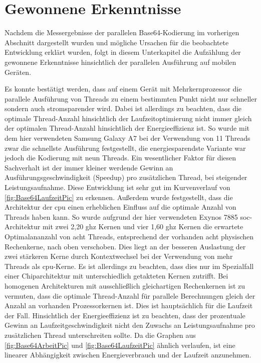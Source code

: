 \section{Gewonnene Erkenntnisse}

Nachdem die Messergebnisse der parallelen Base64-Kodierung im vorherigen Abschnitt dargestellt wurden und mögliche Ursachen für die beobachtete Entwicklung erklärt wurden, folgt in diesem Unterkapitel die Aufzählung der gewonnene Erkenntnisse hinsichtlich der parallelen Ausführung auf mobilen Geräten.

Es konnte bestätigt werden, dass auf einem Gerät mit Mehrkernprozessor die parallele Ausführung von Threads zu einem bestimmten Punkt nicht nur schneller sondern auch stromsparender wird. Dabei ist allerdings zu beachten, dass die optimale Thread-Anzahl hinsichtlich der Laufzeitoptimierung nicht immer gleich der optimalen Thread-Anzahl hinsichtlich der Energieeffizienz ist. So wurde mit dem hier verwendeten Samsung Galaxy A7 bei der Verwendung von 11 Threads zwar die schnellste Ausführung festgestellt, die energiesparendste Variante war jedoch die Kodierung mit neun Threads. Ein wesentlicher Faktor für diesen Sachverhalt ist der immer kleiner werdende Gewinn an Ausführungsgeschwindigkeit (Speedup) pro zusätzlichen  Thread, bei steigender Leistungsaufnahme. Diese Entwicklung ist sehr gut im Kurvenverlauf von \autoref{fig:Base64LaufzeitPic} zu erkennen. Außerdem wurde festgestellt, dass die Architektur der \ac{cpu} einen erheblichen Einfluss auf die optimale Anzahl von Threads  haben kann. So wurde aufgrund der hier verwendeten Exynos 7885 \ac{soc}-Architektur mit zwei 2,20 \ac{ghz} Kernen und vier 1,60 \ac{ghz} Kernen die erwartete Optimalananzahl von acht Threads, entsprechend der vorhanden acht physischen Rechenkerne, nach oben verschoben. Dies liegt an der besseren Auslastung der zwei stärkeren Kerne durch Kontextwechsel bei der Verwendung von mehr Threads als \ac{cpu}-Kerne. Es ist allerdings zu beachten, dass dies nur im Spezialfall einer Chiparchitektur mit unterschiedlich getakteten Kernen zutrifft. Bei homogenen Architekturen mit ausschließlich gleichartigen Rechenkernen ist zu vermuten, dass die optimale Thread-Anzahl für parallele Berechnungen gleich der Anzahl an vorhanden Prozessorkernen ist. Dies ist hauptsächlich für die Laufzeit der Fall. Hinsichtlich der Energieeffizienz ist zu beachten, dass der prozentuale Gewinn an Laufzeitgeschwindigkeit nicht den Zuwachs an Leistungsaufnahme pro zusätzlichen Thread unterschreiten sollte. Da die Graphen aus \autoref{fig:Base64ArbeitPic} und \autoref{fig:Base64LaufzeitPic} ähnlich verlaufen, ist eine linearer Abhängigkeit zwischen Energieverbrauch und der Laufzeit anzunehmen.